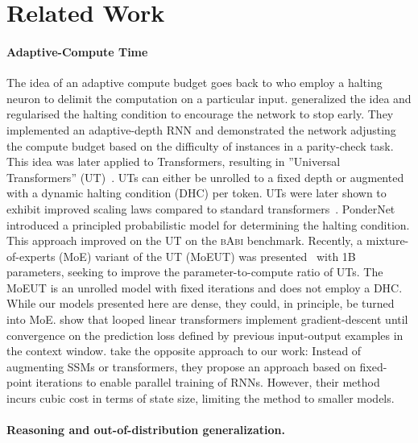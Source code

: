 \section{Related Work}
\paragraph{Adaptive-Compute Time} The idea of an adaptive compute budget goes back to \cite{Schmidhuber_2012} who employ a halting neuron to delimit the computation on a particular input. \citet{Graves_2017} generalized the idea and regularised the halting condition to encourage the network to stop early.
They implemented an adaptive-depth RNN and demonstrated the network adjusting the compute budget based on the difficulty of instances in a parity-check task.
This idea was later applied to Transformers, resulting in ''Universal Transformers'' (UT)~\cite{dehghani2018universal}. UTs can either be unrolled to a fixed depth or augmented with a dynamic halting condition (DHC) per token.
UTs were later shown to exhibit improved scaling laws compared to standard transformers~\cite{Kaplan_McCandlish_Henighan_Brown_Chess_Child_Gray_Radford_Wu_Amodei_2020}.
PonderNet~\cite{Banino_Balaguer_Blundell_2021} introduced a principled probabilistic model for determining the halting condition. This approach improved on the UT on the \textsc{bAbi} benchmark.
Recently, a mixture-of-experts (MoE) variant of the UT (MoEUT) was presented~\cite{csordas2024moeut} with 1B parameters, seeking to improve the parameter-to-compute ratio of UTs.
The MoEUT is an unrolled model with fixed iterations and does not employ a DHC. While our models presented here are dense, they could, in principle, be turned into MoE. 
\citet{gatmiry2024can} show that looped linear transformers implement gradient-descent until convergence on the prediction loss defined by previous input-output examples in the context window.
\citet{lim2024parallelizing} take the opposite approach to our work:
Instead of augmenting SSMs or transformers, they propose an approach based on fixed-point iterations to enable parallel training of RNNs.
However, their method incurs cubic cost in terms of state size, limiting the method to smaller models. 

\paragraph{Reasoning and out-of-distribution generalization.}

